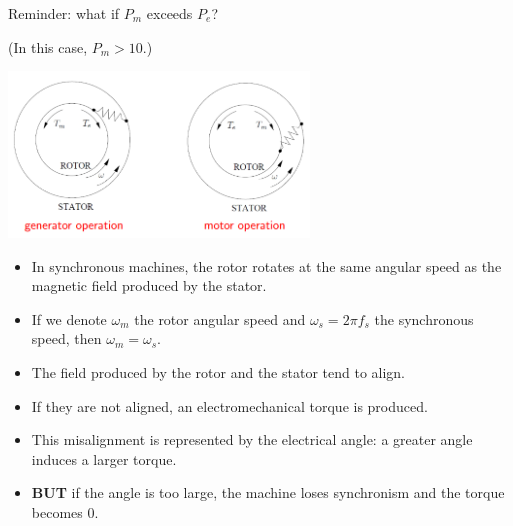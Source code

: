 \begin{frame}[allowframebreaks]{Reminder: what if $P_m$ exceeds $P_e$?}

(In this case,  $P_m > 10.$)

\begin{center}
\includegraphics[width=0.6\textwidth]{images/Angle_MechanicAnalogy.png}
\end{center}
\begin{itemize}
    \item In synchronous machines, the rotor rotates at the same angular speed as the magnetic field produced by the stator.
    \item If we denote $\omega_m$ the rotor angular speed and $\omega_s = 2\pi f_s$ the synchronous speed, then $\omega_m = \omega_s$.
    \item The field produced by the rotor and the stator tend to align. 
    \item If they are not aligned, an electromechanical torque is produced. 
    \item This misalignment is represented by the electrical angle: a greater angle induces a larger torque. 
    \item \textbf{BUT} if the angle is too large, the machine loses synchronism and the torque becomes 0.
\end{itemize}
\end{frame}

